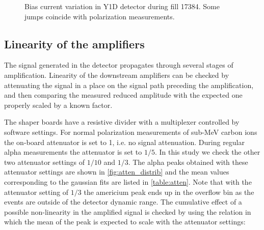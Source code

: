 \documentclass[a4paper,12pt]{article}
\begin{document}
\begin{figure}
\caption{Bias current variation in Y1D detector during fill 17384. Some jumps
coincide with polarization measurements.}
\label{fig:bc_jumping}
\end{figure}

\subsection{Linearity of the amplifiers}

The signal generated in the detector propagates through several stages of
amplification. Linearity of the downstream amplifiers can be checked by
attenuating the signal in a place on the signal path preceding the
amplification, and then comparing the measured reduced amplitude with the
expected one properly scaled by a known factor.

The shaper boards have a resistive divider with a multiplexer controlled by
software settings. For normal polarization measurements of sub-MeV carbon ions
the on-board attenuator is set to 1, i.e. no signal attenuation. During regular
alpha measurements the attenuator is set to $1/5$. In this study we check the
other two attenuator settings of $1/10$ and $1/3$. The alpha peaks obtained with
these attenuator settings are shown in \cref{fig:atten_distrib} and the
mean values corresponding to the gaussian fits are listed in
\cref{table:atten}. Note that with the attenuator setting of $1/3$ the
americium peak ends up in the overflow bin as the events are outside of the detector
dynamic range. The cumulative effect of a possible non-linearity in the
amplified signal is checked by using the relation in which the mean of
the peak is expected to scale with the attenuator settings:
\end{document}
